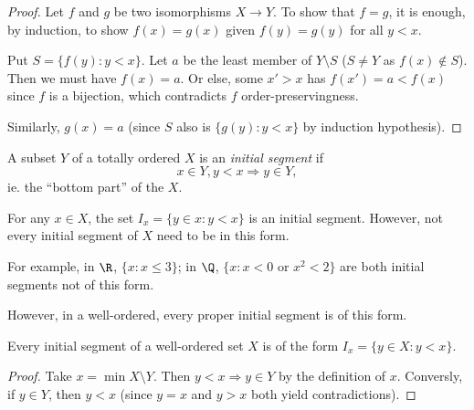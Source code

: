 \documentclass[a4paper]{article}
\begin{document}
\begin{proof}
  Let $f$ and $g$ be two isomorphisms $X\to Y$. To show that $f = g$, it is enough, by induction, to show $f(x) = g(x)$ given $f(y) = g(y)$ for all $y < x$.

  Put $S = \{f(y): y < x\}$. Let $a$ be the least member of $Y\setminus S$ ($S\not= Y$ as $f(x) \not\in S$). Then we must have $f(x) = a$. Or else, some $x ' > x$ has $f(x') = a < f(x)$ since $f$ is a bijection, which contradicts $f$ order-preservingness.

  Similarly, $g(x) = a$ (since $S$ also is $\{g(y): y < x\}$ by induction hypothesis).
\end{proof}


\begin{defi}
  A subset $Y$ of a totally ordered $X$ is an \emph{initial segment} if
  \[
    x\in Y, y< x \Rightarrow  y\in Y,
  \]
  ie. the ``bottom part'' of the $X$.
  \begin{center}
  \end{center}
\end{defi}

\begin{eg}
  For any $x\in X$, the set $I_x = \{y\in x: y< x\}$ is an initial segment. However, not every initial segment of $X$ need to be in this form.

  For example, in $\R$, $\{x: x\leq 3\}$; in $\Q$, $\{x: x < 0\text{ or }x^2 < 2\}$ are both initial segments not of this form.
\end{eg}
However, in a well-ordered, every proper initial segment is of this form.
\begin{prop}
  Every initial segment of a well-ordered set $X$ is of the form $I_x = \{y\in X: y < x\}$.
\end{prop}

\begin{proof}
  Take $x = \min X\setminus Y$. Then $y < x\Rightarrow y\in Y$ by the definition of $x$.  Conversly, if $y\in Y$, then $y < x$ (since $y = x$ and $y > x$ both yield contradictions).
\end{proof}
\end{document}
